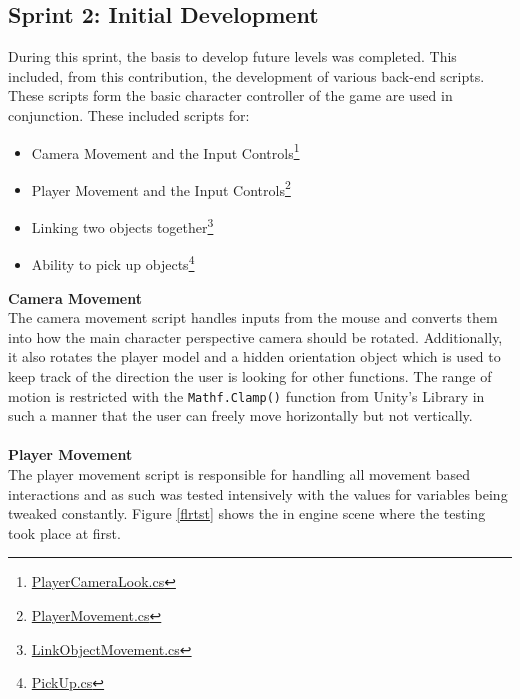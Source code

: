 \subsection{Sprint 2: Initial Development}
During this sprint, the basis to develop future levels was completed. This included, from this contribution, the development of various back-end scripts. These scripts form the basic character controller of the game are used in conjunction. These included scripts for:
\begin{itemize}
\item Camera Movement and the Input Controls\footnote{\href{https://github.com/Josh-SCG/Spherical_Shadows/blob/main/Assets/Scripts/PlayerCameraLook.cs}{PlayerCameraLook.cs}}

\item Player Movement and the Input Controls\footnote{\href{https://github.com/Josh-SCG/Spherical_Shadows/blob/main/Assets/Scripts/PlayerMovement.cs}{PlayerMovement.cs}}

\item Linking two objects together\footnote{\href{https://github.com/Josh-SCG/Spherical_Shadows/blob/main/Assets/Scripts/LinkObjectMovement.cs}{LinkObjectMovement.cs}}

\item Ability to pick up objects\footnote{\href{https://github.com/Josh-SCG/Spherical_Shadows/blob/main/Assets/Scripts/PickUp.cs}{PickUp.cs}}
\end{itemize}
\newpage
\noindent \textbf{Camera Movement}\\
The camera movement script handles inputs from the mouse and converts them into how the main character perspective camera should be rotated. Additionally, it also rotates the player model and a hidden orientation object which is used to keep track of the direction the user is looking for other functions. The range of motion is restricted with the \texttt{Mathf.Clamp()} function from Unity's Library in such a manner that the user can freely move horizontally but not vertically. 
\\\\
\textbf{Player Movement}\\
The player movement script is responsible for handling all movement based interactions and as such was tested intensively with the values for variables being tweaked constantly. Figure \ref{flrtst} shows the in engine scene where the testing took place at first. 

